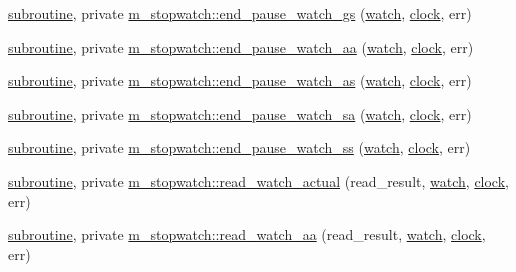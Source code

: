 \begin{DoxyCompactItemize}
\item 
\hyperlink{M__stopwatch_83_8txt_acfbcff50169d691ff02d4a123ed70482}{subroutine}, private \hyperlink{namespacem__stopwatch_a73243081be89522031b0767e9141663a}{m\+\_\+stopwatch\+::end\+\_\+pause\+\_\+watch\+\_\+gs} (\hyperlink{read__watch_83_8txt_ad2129669fa47b8899641309620add095}{watch}, \hyperlink{stop__watch_83_8txt_a148c035b430d6edf5413dbd2704facfb}{clock}, err)
\item 
\hyperlink{M__stopwatch_83_8txt_acfbcff50169d691ff02d4a123ed70482}{subroutine}, private \hyperlink{namespacem__stopwatch_a435c9495ff60ec1dc27d4b41f4030582}{m\+\_\+stopwatch\+::end\+\_\+pause\+\_\+watch\+\_\+aa} (\hyperlink{read__watch_83_8txt_ad2129669fa47b8899641309620add095}{watch}, \hyperlink{stop__watch_83_8txt_a148c035b430d6edf5413dbd2704facfb}{clock}, err)
\item 
\hyperlink{M__stopwatch_83_8txt_acfbcff50169d691ff02d4a123ed70482}{subroutine}, private \hyperlink{namespacem__stopwatch_abf357521b2751b550b6097542dadf213}{m\+\_\+stopwatch\+::end\+\_\+pause\+\_\+watch\+\_\+as} (\hyperlink{read__watch_83_8txt_ad2129669fa47b8899641309620add095}{watch}, \hyperlink{stop__watch_83_8txt_a148c035b430d6edf5413dbd2704facfb}{clock}, err)
\item 
\hyperlink{M__stopwatch_83_8txt_acfbcff50169d691ff02d4a123ed70482}{subroutine}, private \hyperlink{namespacem__stopwatch_a4e478402d1066b90c1807d5fddb7e803}{m\+\_\+stopwatch\+::end\+\_\+pause\+\_\+watch\+\_\+sa} (\hyperlink{read__watch_83_8txt_ad2129669fa47b8899641309620add095}{watch}, \hyperlink{stop__watch_83_8txt_a148c035b430d6edf5413dbd2704facfb}{clock}, err)
\item 
\hyperlink{M__stopwatch_83_8txt_acfbcff50169d691ff02d4a123ed70482}{subroutine}, private \hyperlink{namespacem__stopwatch_a1aeced31682c43f2ead6efaf679cad8c}{m\+\_\+stopwatch\+::end\+\_\+pause\+\_\+watch\+\_\+ss} (\hyperlink{read__watch_83_8txt_ad2129669fa47b8899641309620add095}{watch}, \hyperlink{stop__watch_83_8txt_a148c035b430d6edf5413dbd2704facfb}{clock}, err)
\item 
\hyperlink{M__stopwatch_83_8txt_acfbcff50169d691ff02d4a123ed70482}{subroutine}, private \hyperlink{namespacem__stopwatch_a5cac73ed1e81ddd74796a45b37b31ec4}{m\+\_\+stopwatch\+::read\+\_\+watch\+\_\+actual} (read\+\_\+result, \hyperlink{read__watch_83_8txt_ad2129669fa47b8899641309620add095}{watch}, \hyperlink{stop__watch_83_8txt_a148c035b430d6edf5413dbd2704facfb}{clock}, err)
\item 
\hyperlink{M__stopwatch_83_8txt_acfbcff50169d691ff02d4a123ed70482}{subroutine}, private \hyperlink{namespacem__stopwatch_a528d4073fce87b4e438a9cfbe0f12549}{m\+\_\+stopwatch\+::read\+\_\+watch\+\_\+aa} (read\+\_\+result, \hyperlink{read__watch_83_8txt_ad2129669fa47b8899641309620add095}{watch}, \hyperlink{stop__watch_83_8txt_a148c035b430d6edf5413dbd2704facfb}{clock}, err)

\end{DoxyCompactItemize}
